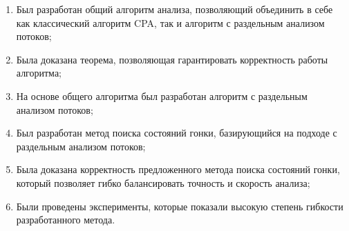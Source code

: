 \begin{enumerate}
  \item Был разработан общий алгоритм анализа, позволяющий объединить в себе как классический алгоритм CPA, так и алгоритм с раздельным анализом потоков;
  \item Была доказана теорема, позволяющая гарантировать корректность работы алгоритма;
  \item На основе общего алгоритма был разработан алгоритм с раздельным анализом потоков;
  \item Был разработан метод поиска состояний гонки, базирующийся на подходе с раздельным анализом потоков;
  \item Была доказана корректность предложенного метода поиска состояний гонки, который позволяет гибко балансировать точность и скорость анализа;
  \item Были проведены эксперименты, которые показали высокую степень гибкости разработанного метода.
\end{enumerate}
